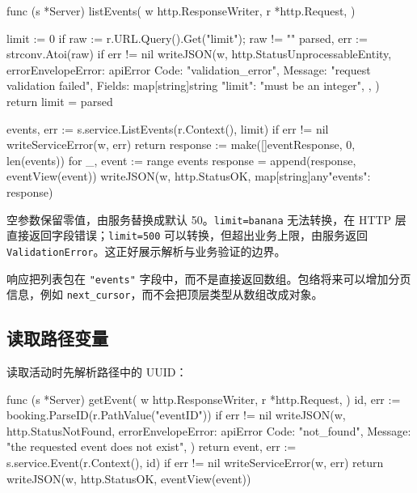 \begin{gocode}[title={代码清单 12.30 \texttt{events.go}：解析列表限制}]
func (s *Server) listEvents(
    w http.ResponseWriter,
    r *http.Request,
) {
    limit := 0
    if raw := r.URL.Query().Get("limit"); raw != "" {
        parsed, err := strconv.Atoi(raw)
        if err != nil {
            writeJSON(w, http.StatusUnprocessableEntity,
                errorEnvelope{Error: apiError{
                    Code: "validation_error",
                    Message: "request validation failed",
                    Fields: map[string]string{
                        "limit": "must be an integer",
                    },
                }})
            return
        }
        limit = parsed
    }

    events, err := s.service.ListEvents(r.Context(), limit)
    if err != nil {
        writeServiceError(w, err)
        return
    }
    response := make([]eventResponse, 0, len(events))
    for _, event := range events {
        response = append(response, eventView(event))
    }
    writeJSON(w, http.StatusOK,
        map[string]any{"events": response})
}
\end{gocode}

空参数保留零值，由服务替换成默认 50。\texttt{limit=banana} 无法转换，在 HTTP 层直接返回字段错误；\texttt{limit=500} 可以转换，但超出业务上限，由服务返回 \texttt{ValidationError}。这正好展示解析与业务验证的边界。

响应把列表包在 \texttt{"events"} 字段中，而不是直接返回数组。包络将来可以增加分页信息，例如 \texttt{next\_cursor}，而不会把顶层类型从数组改成对象。

\subsection{读取路径变量}

读取活动时先解析路径中的 UUID：

\begin{gocode}[title={代码清单 12.31 \texttt{events.go}：读取活动}]
func (s *Server) getEvent(
    w http.ResponseWriter,
    r *http.Request,
) {
    id, err := booking.ParseID(r.PathValue("eventID"))
    if err != nil {
        writeJSON(w, http.StatusNotFound,
            errorEnvelope{Error: apiError{
                Code: "not_found",
                Message: "the requested event does not exist",
            }})
        return
    }
    event, err := s.service.Event(r.Context(), id)
    if err != nil {
        writeServiceError(w, err)
        return
    }
    writeJSON(w, http.StatusOK, eventView(event))
}
\end{gocode}

